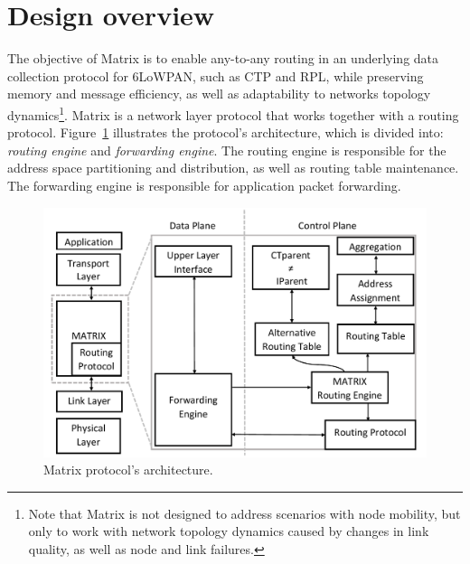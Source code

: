 \section{Design overview}
\label{sec:matrix}

The objective of Matrix is to enable any-to-any routing in an
underlying data collection protocol for 6LoWPAN, such as CTP and
RPL, while preserving memory and message efficiency, as well as
adaptability to networks topology dynamics\footnote{Note that Matrix
is not designed to address scenarios with node mobility, but only to
work with network topology dynamics caused by changes in link
quality, as well as node and link failures.}. Matrix is a network
layer protocol that works together with a routing protocol.
Figure~\ref{fig:architecture} illustrates the protocol's
architecture, which is divided into: \textit{routing engine} and
\textit{forwarding engine}. The routing engine is responsible for
the address space partitioning and distribution, as well as routing
table maintenance. The forwarding engine is responsible for
application packet forwarding.

\begin{figure}[!ht]
    \centering
    \includegraphics[width=1\columnwidth]{./Images/Architecture.pdf}
\caption{Matrix protocol's architecture.}
    \label{fig:architecture}
\end{figure}

